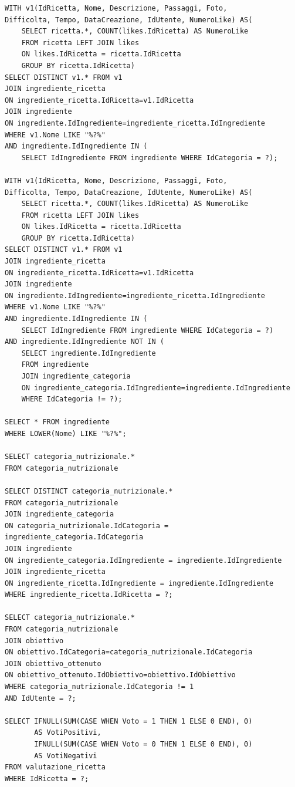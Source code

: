 ﻿\documentclass[a4paper,12pt]{report}
\begin{document}
\begin{verbatim}
WITH v1(IdRicetta, Nome, Descrizione, Passaggi, Foto, 
Difficolta, Tempo, DataCreazione, IdUtente, NumeroLike) AS(
    SELECT ricetta.*, COUNT(likes.IdRicetta) AS NumeroLike
    FROM ricetta LEFT JOIN likes
    ON likes.IdRicetta = ricetta.IdRicetta
    GROUP BY ricetta.IdRicetta)
SELECT DISTINCT v1.* FROM v1
JOIN ingrediente_ricetta
ON ingrediente_ricetta.IdRicetta=v1.IdRicetta
JOIN ingrediente
ON ingrediente.IdIngrediente=ingrediente_ricetta.IdIngrediente
WHERE v1.Nome LIKE "%?%"
AND ingrediente.IdIngrediente IN (
    SELECT IdIngrediente FROM ingrediente WHERE IdCategoria = ?);

WITH v1(IdRicetta, Nome, Descrizione, Passaggi, Foto, 
Difficolta, Tempo, DataCreazione, IdUtente, NumeroLike) AS(
    SELECT ricetta.*, COUNT(likes.IdRicetta) AS NumeroLike
    FROM ricetta LEFT JOIN likes
    ON likes.IdRicetta = ricetta.IdRicetta
    GROUP BY ricetta.IdRicetta)
SELECT DISTINCT v1.* FROM v1
JOIN ingrediente_ricetta
ON ingrediente_ricetta.IdRicetta=v1.IdRicetta
JOIN ingrediente
ON ingrediente.IdIngrediente=ingrediente_ricetta.IdIngrediente
WHERE v1.Nome LIKE "%?%"
AND ingrediente.IdIngrediente IN (
    SELECT IdIngrediente FROM ingrediente WHERE IdCategoria = ?)
AND ingrediente.IdIngrediente NOT IN (
    SELECT ingrediente.IdIngrediente
    FROM ingrediente
    JOIN ingrediente_categoria
    ON ingrediente_categoria.IdIngrediente=ingrediente.IdIngrediente
    WHERE IdCategoria != ?);

SELECT * FROM ingrediente
WHERE LOWER(Nome) LIKE "%?%";

SELECT categoria_nutrizionale.*
FROM categoria_nutrizionale

SELECT DISTINCT categoria_nutrizionale.*
FROM categoria_nutrizionale
JOIN ingrediente_categoria
ON categoria_nutrizionale.IdCategoria = ingrediente_categoria.IdCategoria
JOIN ingrediente
ON ingrediente_categoria.IdIngrediente = ingrediente.IdIngrediente
JOIN ingrediente_ricetta
ON ingrediente_ricetta.IdIngrediente = ingrediente.IdIngrediente
WHERE ingrediente_ricetta.IdRicetta = ?;

SELECT categoria_nutrizionale.*
FROM categoria_nutrizionale
JOIN obiettivo
ON obiettivo.IdCategoria=categoria_nutrizionale.IdCategoria
JOIN obiettivo_ottenuto
ON obiettivo_ottenuto.IdObiettivo=obiettivo.IdObiettivo
WHERE categoria_nutrizionale.IdCategoria != 1
AND IdUtente = ?;

SELECT IFNULL(SUM(CASE WHEN Voto = 1 THEN 1 ELSE 0 END), 0)
       AS VotiPositivi,
       IFNULL(SUM(CASE WHEN Voto = 0 THEN 1 ELSE 0 END), 0)
       AS VotiNegativi
FROM valutazione_ricetta
WHERE IdRicetta = ?;


\end{verbatim}
\end{document}
